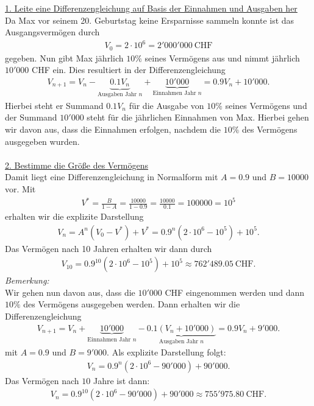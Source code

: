 \underline{1. Leite eine Differenzengleichung auf Basis der Einnahmen und Ausgaben her}\\
Da Max vor seinem 20. Geburtstag keine Ersparnisse sammeln konnte ist das Ausgangsvermögen durch
\begin{align*}
V_0 = 2 \cdot 10^6 = 2'000'000  \ \textrm{CHF}
\end{align*}
gegeben. Nun gibt Max jährlich $ 10 \% $ seines Vermögens aus und nimmt jährlich $ 10'000 $ CHF ein. Dies resultiert in der Differenzengleichung
\begin{align*}
V_{n+1} = V_n - \underbrace{0.1 V_n}_{\textrm{Ausgaben Jahr } n} + \underbrace{10'000}_{\textrm{Einnahmen Jahr } n}= 0.9 V_n + 10'000.
\end{align*}
Hierbei steht er Summand $ 0.1 V_n $ für die Ausgabe von $ 10 \% $ seines Vermögens und der Summand $ 10'000 $ steht für die jährlichen Einnahmen von Max.
Hierbei gehen wir davon aus, dass die Einnahmen erfolgen, nachdem die $ 10 \% $ des Vermögens ausgegeben wurden.\\
\\
\underline{2. Bestimme die Größe des Vermögens}\\
Damit liegt eine Differenzengleichung in Normalform mit $  A= 0.9 $ und $ B = 10000 $ vor.
Mit 
\begin{align*}
V^\ast = \frac{B}{1- A} = \frac{10000}{1- 0.9} = \frac{10000}{0.1} = 100000 = 10^5
\end{align*}
erhalten wir die explizite Darstellung 
\begin{align*}
V_n = A^n(V_0 - V^\ast)+ V^\ast 
=
0.9^n(2 \cdot 10^6 - 10^5) + 10^5. 
\end{align*}
Das Vermögen nach 10 Jahren erhalten wir dann durch
\begin{align*}
V_{10} = 0.9^{10}(2 \cdot 10^6 - 10^5) + 10^5 \approx 762'489.05 \ \textrm{CHF}.
\end{align*}
\newpage
\textit{Bemerkung:}\\
Wir gehen nun davon aus, dass die $ 10'000 $ CHF eingenommen werden und dann $ 10 \%  $ des Vermögens ausgegeben werden. Dann erhalten wir die Differenzengleichung
\begin{align*}
V_{n+1} = V_n  + \underbrace{10'000}_{\textrm{Einnahmen Jahr } n}- \underbrace{0.1( V_n + 10'000)}_{\textrm{Ausgaben Jahr } n}= 0.9 V_n + 9'000.
\end{align*}
mit $ A = 0.9 $ und $ B = 9'000 $. Als explizite Darstellung folgt:
\begin{align*}
V_n = 0.9^n(2\cdot 10^6 - 90'000) + 90'000.
\end{align*}
Das Vermögen nach $ 10 $ Jahre ist dann:
\begin{align*}
V_n = 0.9^{10}(2\cdot 10^6 - 90'000) + 90'000 \approx 755'975.80 \ \textrm{CHF}.
\end{align*}
\newpage
